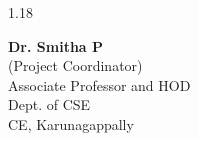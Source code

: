 \begin{spacing}{1.18}
\vspace*{1.2cm}

\begin{center}
	\textbf{Dr. Smitha P} \\
	(Project Coordinator) \\
	Associate Professor and HOD \\
	Dept. of CSE \\
	CE, Karunagappally
\end{center}

\end{spacing}

\thispagestyle{empty}
